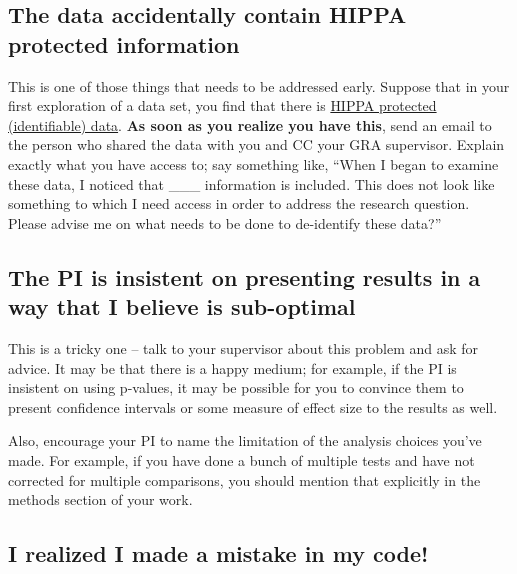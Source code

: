 \documentclass[
]{book}
\begin{document}
\hypertarget{the-data-accidentally-contain-hippa-protected-information}{%
\subsection{The data accidentally contain HIPPA protected information}\label{the-data-accidentally-contain-hippa-protected-information}}

This is one of those things that needs to be addressed early. Suppose that in your first exploration of a data set, you find that there is \href{https://compliancy-group.com/what-is-hipaa-pii/\#:~:text=What\%20Kinds\%20of\%20Information\%20Constitute,numbers\%2C\%20and\%20bank\%20account\%20numbers.}{HIPPA protected (identifiable) data}. \textbf{As soon as you realize you have this}, send an email to the person who shared the data with you and CC your GRA supervisor. Explain exactly what you have access to; say something like, ``When I began to examine these data, I noticed that \_\_\_ information is included. This does not look like something to which I need access in order to address the research question. Please advise me on what needs to be done to de-identify these data?''

\hypertarget{the-pi-is-insistent-on-presenting-results-in-a-way-that-i-believe-is-sub-optimal}{%
\subsection{The PI is insistent on presenting results in a way that I believe is sub-optimal}\label{the-pi-is-insistent-on-presenting-results-in-a-way-that-i-believe-is-sub-optimal}}

This is a tricky one -- talk to your supervisor about this problem and ask for advice. It may be that there is a happy medium; for example, if the PI is insistent on using p-values, it may be possible for you to convince them to present confidence intervals or some measure of effect size to the results as well.

Also, encourage your PI to name the limitation of the analysis choices you've made. For example, if you have done a bunch of multiple tests and have not corrected for multiple comparisons, you should mention that explicitly in the methods section of your work.

\hypertarget{i-realized-i-made-a-mistake-in-my-code}{%
\subsection{I realized I made a mistake in my code!}\label{i-realized-i-made-a-mistake-in-my-code}}
\end{document}
